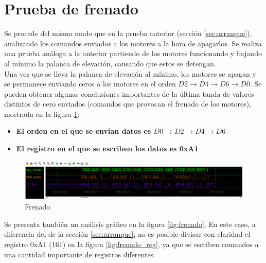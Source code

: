 \documentclass[main]{subfiles}
\begin{document}
\section{Prueba de frenado}
\label{sec:frenado}
Se procede del mismo modo que en la prueba anterior (secci\'on \ref{sec:arranque}), analizando los comandos enviados a los motores a la hora de apagarlos. Se realiza una prueba an\'aloga a la anterior partiendo de los motores funcionando y bajando al m\'inimo la palanca de elevaci\'on, causando que estos se detengan.\\

Una vez que se lleva la palanca de elevaci\'on al m\'inimo, los motores se apagan y se permanece enviando ceros a los motores en el orden $D2\rightarrow D4\rightarrow D6\rightarrow D0$. Se pueden obtener algunas conclusiones importantes de la \'ultima tanda de valores distintos de cero enviados (comandos que provocan el frenado de los motores), mostrada en la figura \ref{fig:snif_frenado}:
\begin{itemize}
\item \textbf{El orden en el que se env\'ian datos es $D0\rightarrow D2\rightarrow D4\rightarrow D6$}
\item \textbf{El registro en el que se escriben los datos es 0xA1}
\end{itemize}

\begin{figure}[h!]
	\centering
	\includegraphics[width=1\textwidth]{./pics_sniffer/snif_frenado.png}
	\caption{Frenado}
	\label{fig:snif_frenado}
\end{figure}

Se presenta tambi\'en un an\'alisis gr\'afico en la figura \ref{fig:frenado}. En este caso, a diferencia del de la secci\'on \ref{sec:arranque}, no es posible divisar con claridad el registro 0xA1 (161) en la figura \ref{fig:frenado_reg}, ya que se escriben comandos a una cantidad importante de registros diferentes.\\
\end{document}
